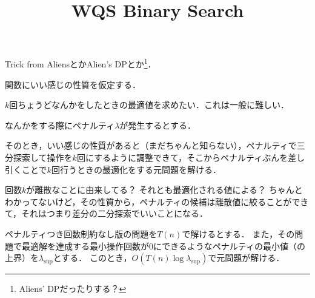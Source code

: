 \documentclass{jsarticle}
\title{WQS Binary Search}
\begin{document}
\maketitle

Trick from AliensとかAlien's DPとか\footnote{Aliens' DPだったりする？}．

関数にいい感じの性質を仮定する．


$k$回ちょうどなんかをしたときの最適値を求めたい．これは一般に難しい．

なんかをする際にペナルティ$\lambda$が発生するとする．

そのとき，いい感じの性質があると（まだちゃんと知らない），ペナルティで三分探索して操作を$k$回にするように調整できて，そこからペナルティぶんを差し引くことで$k$回行うときの最適化をする元問題を解ける．

回数$k$が離散なことに由来してる？ それとも最適化される値による？ ちゃんとわかってないけど，その性質から，ペナルティの候補は離散値に絞ることができて，それはつまり差分の二分探索でいいことになる．

ペナルティつき回数制約なし版の問題を$T(n)$で解けるとする．
また，その問題で最適解を達成する最小操作回数が$0$にできるようなペナルティの最小値（の上界）を$\lambda_{\mathrm{sup}}$とする．
このとき，$O(T(n)\log\lambda_{\mathrm{sup}})$で元問題が解ける．
\end{document}
